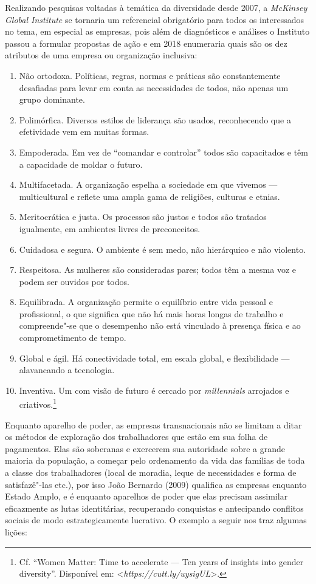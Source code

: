 Realizando pesquisas voltadas à temática da diversidade desde 2007, a
\emph{McKinsey Global Institute} se tornaria um referencial obrigatório
para todos os interessados no tema, em especial as empresas, pois além
de diagnósticos e análises o Instituto passou a formular propostas de
ação e em 2018 enumeraria quais são os dez atributos de uma empresa ou
organização inclusiva:

\begin{enumerate}
\def\labelenumi{\arabic{enumi}.}
\item
  Não ortodoxa. Políticas, regras, normas e práticas são constantemente
  desafiadas para levar em conta as necessidades de todos, não apenas um
  grupo dominante.
\item
  Polimórfica. Diversos estilos de liderança são usados, reconhecendo
  que a efetividade vem em muitas formas.
\item
  Empoderada. Em vez de ``comandar e controlar'' todos são capacitados e
  têm a capacidade de moldar o futuro.
\item
  Multifacetada. A organização espelha a sociedade em que vivemos ---
  multicultural e reflete uma ampla gama de religiões, culturas e
  etnias.
\item
  Meritocrática e justa. Os processos são justos e todos são tratados
  igualmente, em ambientes livres de preconceitos.
\item
  Cuidadosa e segura. O ambiente é sem medo, não hierárquico e não
  violento.
\item
  Respeitosa. As mulheres são consideradas pares; todos têm a mesma voz
  e podem ser ouvidos por todos.
\item
  Equilibrada. A organização permite o equilíbrio entre vida pessoal e
  profissional, o que significa que não há mais horas longas de trabalho
  e compreende"-se que o desempenho não está vinculado à presença física
  e ao comprometimento de tempo.
\item
  Global e ágil. Há conectividade total, em escala global, e
  flexibilidade --- alavancando a tecnologia.
\item
  Inventiva. Um  com visão de futuro é cercado por \emph{millennials}
  arrojados e criativos.\footnote{Cf. ``Women Matter: Time to accelerate
    --- Ten years of insights into gender diversity''. Disponível em:
    \textless{}\emph{https://cutt.ly/uysigUL}\textgreater{}.}
\end{enumerate}

Enquanto aparelho de poder, as empresas transnacionais não se limitam a
ditar os métodos de exploração dos trabalhadores que estão em sua folha
de pagamentos. Elas são soberanas e exercerem sua autoridade sobre a
grande maioria da população, a começar pelo ordenamento da vida das
famílias de toda a classe dos trabalhadores (local de moradia, leque de
necessidades e forma de satisfazê"-las etc.), por isso João Bernardo
(2009) qualifica as empresas enquanto Estado Amplo, e é enquanto
aparelhos de poder que elas precisam assimilar eficazmente as lutas
identitárias, recuperando conquistas e antecipando conflitos sociais de
modo estrategicamente lucrativo. O exemplo a seguir nos traz algumas
lições:

